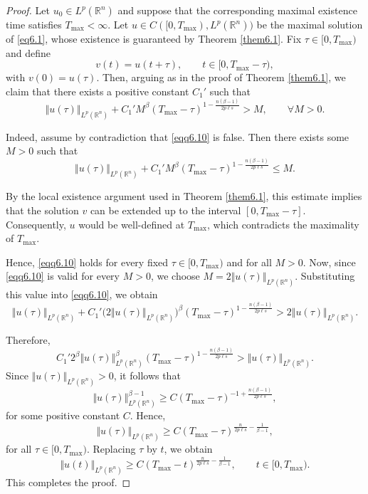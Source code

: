 \documentclass[12pt, reqno]{amsart}
\theoremstyle{definition}
\theoremstyle{remark}
\numberwithin{equation}{section}
\begin{document}
\begin{proof} Let $u_0 \in L^p(\mathbb{R}^n)$ and suppose that the corresponding maximal existence time satisfies $T_{\max}<\infty$. Let $u \in C([0,T_{\max}),L^p(\mathbb{R}^n)) $ be the maximal solution of \eqref{eq6.1}, whose existence is guaranteed by Theorem \ref{them6.1}. Fix $\tau \in [0,T_{\max})$ and define \[ v(t)=u(t+\tau), \qquad t \in[0, T_{\max}-\tau ), \] with $v(0)=u(\tau).$ Then, arguing as in the proof of Theorem \ref{them6.1}, we claim that there exists a positive constant $C_1'$ such that 
\begin{equation}\label{eqq6.10} \Vert u(\tau)\Vert_{L^p(\mathbb{R}^n)} + C_1' M^\beta (T_{\max}-\tau)^{1-\frac{n(\beta-1)}{2p\ell s}} > M, \qquad \forall M>0. \end{equation} 

Indeed, assume by contradiction that \eqref{eqq6.10} is false. Then there exists some $M>0$ such that \[ \Vert u(\tau)\Vert_{L^p(\mathbb{R}^n)} + C_1' M^\beta (T_{\max}-\tau )^{1-\frac{n(\beta-1)}{2p\ell s}} \leq M. \] 

By the local existence argument used in Theorem \ref{them6.1}, this estimate implies that the solution $v$ can be extended up to the interval $[0,T_{\max}-\tau].$ Consequently, $u$ would be well-defined at $T_{\max}$, which contradicts the maximality of $T_{\max}$. 

Hence, \eqref{eqq6.10} holds for every fixed $\tau \in[0,T_{\max})$ and for all $M>0$. Now, since \eqref{eqq6.10} is valid for every $M>0$, we choose $M=2\Vert u(\tau)\Vert_{L^p(\mathbb{R}^n)}.$ Substituting this value into \eqref{eqq6.10}, we obtain \[ \Vert u(\tau)\Vert_{L^p(\mathbb{R}^n)} + C_1' \bigl(2\Vert u(\tau)\Vert_{L^p(\mathbb{R}^n)}\bigr)^\beta (T_{\max}-\tau)^{1-\frac{n(\beta-1)}{2p\ell s}} > 2\Vert u(\tau)\Vert_{L^p(\mathbb{R}^n)}. \] 

Therefore, \[ C_1' 2^\beta \Vert u(\tau)\Vert_{L^p(\mathbb{R}^n)}^\beta (T_{\max}-\tau)^{1-\frac{n(\beta-1)}{2p\ell s}} > \Vert u(\tau)\Vert_{L^p(\mathbb{R}^n)}. \] Since $\Vert u(\tau)\Vert_{L^p(\mathbb{R}^n)}>0$, it follows that \[ \Vert u(\tau)\Vert_{L^p(\mathbb{R}^n)}^{\beta-1} \geq C (T_{\max}-\tau)^{-1+\frac{n(\beta-1)}{2p\ell s}}, \] for some positive constant $C$. Hence, \[ \Vert u(\tau)\Vert_{L^p(\mathbb{R}^n)} \geq C (T_{\max}-\tau)^{\frac{n}{2p\ell s}-\frac{1}{\beta-1}}, \] for all $\tau \in[0,T_{\max})$. Replacing $\tau$ by $t$, we obtain \[ \Vert u(t)\Vert_{L^p(\mathbb{R}^n)} \geq C (T_{\max}-t)^{\frac{n}{2p\ell s}-\frac{1}{\beta-1}}, \qquad t\in[0,T_{\max}). \] This completes the proof. \end{proof}
\end{document}
